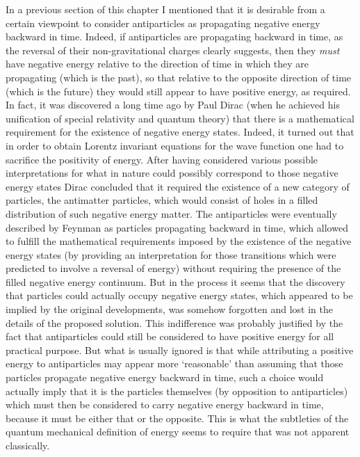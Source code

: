 \documentclass[notitlepage,12pt]{report}
\begin{document}
\bigskip

\noindent In a previous section of this chapter I mentioned that it is desirable from a certain viewpoint to consider antiparticles as propagating negative energy backward in time. Indeed, if antiparticles are propagating backward in time, as the reversal of their non-gravitational charges clearly suggests, then they \textit{must} have negative energy relative to the direction of time in which they are propagating (which is the past), so that relative to the opposite direction of time (which is the future) they would still appear to have positive energy, as required. In fact, it was discovered a long time ago by Paul Dirac (when he achieved his unification of special relativity and quantum theory) that there is a mathematical requirement for the existence of negative energy states. Indeed, it turned out that in order to obtain Lorentz invariant equations for the wave function one had to sacrifice the positivity of energy. After having considered various possible interpretations for what in nature could possibly correspond to those negative energy states Dirac concluded that it required the existence of a new category of particles, the antimatter particles, which would consist of holes in a filled distribution of such negative energy matter. The antiparticles were eventually described by Feynman as particles propagating backward in time, which allowed to fulfill the mathematical requirements imposed by the existence of the negative energy states (by providing an interpretation for those transitions which were predicted to involve a reversal of energy) without requiring the presence of the filled negative energy continuum. But in the process it seems that the discovery that particles could actually occupy negative energy states, which appeared to be implied by the original developments, was somehow forgotten and lost in the details of the proposed solution. This indifference was probably justified by the fact that antiparticles could still be considered to have positive energy for all practical purpose. But what is usually ignored is that while attributing a positive energy to antiparticles may appear more `reasonable' than assuming that those particles propagate negative energy backward in time, such a choice would actually imply that it is the particles themselves (by opposition to antiparticles) which must then be considered to carry negative energy backward in time, because it must be either that or the opposite. This is what the subtleties of the quantum mechanical definition of energy seems to require that was not apparent classically.
\end{document}
